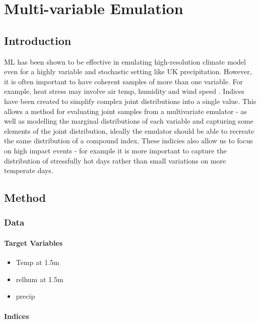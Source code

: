 \let\textcircled=\pgftextcircled
\chapter{Multi-variable Emulation}
\label{chap:mv}

\section{Introduction}
\label{mv:intro}

ML has been shown to be effective in emulating high-resolution climate model even for a highly variable and stochastic setting like UK precipitation.
However, it is often important to have coherent samples of more than one variable. For example, heat stress may involve air temp, humidity and wind speed \cite{Blazejczyk2012UTCIcomparison}. Indices have been created to simplify complex joint distributions into a single value. This allows a method for evaluating joint samples from a multivariate emulator - as well as modelling the marginal distributions of each variable and capturing some elements of the joint distribution, ideally the emulator should be able to recreate the same distribution of a compound index.
These indicies also allow us to focus on high impact events - for example it is more important to capture the distribution of stressfully hot days rather than small variations on more temperate days.

\section{Method}
\label{mv:method}

\subsection{Data}

\subsubsection{Target Variables}

\begin{itemize}
    \item Temp at 1.5m
    \item relhum at 1.5m
    \item precip
\end{itemize}

\subsubsection{Indices}

